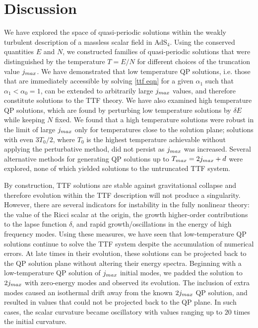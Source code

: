 \documentclass[../PhD.tex]{subfiles}
\begin{document}

\section{Discussion}
\label{sec: discussion}

We have explored the space of quasi-periodic solutions within the weakly turbulent description of a massless scalar field in AdS$_4$. Using the conserved quantities $E$ and $N$, we constructed families of quasi-periodic solutions that were distinguished by the temperature $T = E/N$ for different choices of the truncation value $j_{max}$. We have demonstrated that low temperature QP solutions, i.e. those that are immediately accessible by solving \eqref{ttf eqn} for a given $\alpha_1$ such that $\alpha_1 < \alpha_0 = 1$, can be extended to arbitrarily large $j_{max}$ values, and therefore constitute solutions to the TTF theory. We have also examined high temperature QP solutions, which are found by perturbing low temperature solutions by $\delta E$ while keeping $N$ fixed. We found that a high temperature solutions were robust in the limit of large $j_{max}$ only for temperatures close to the solution plane; solutions with even $3 T_0 / 2$, where $T_0$ is the highest temperature achievable without applying the perturbative method, did not persist as $j_{max}$ was increased. Several alternative methods for generating QP solutions up to $T_{max} = 2j_{max} + d$ were explored, none of which yielded solutions to the untruncated TTF system.

By construction, TTF solutions are stable against gravitational collapse and therefore evolution within the TTF description will not produce a singularity. However, there are several indicators for instability in the fully nonlinear theory: the value of the Ricci scalar at the origin, the growth higher-order contributions to the lapse function $\delta$, and rapid growth/oscillations in the energy of high frequency modes. Using these measures, we have seen that low-temperature QP solutions continue to solve the TTF system despite the accumulation of numerical errors. At late times in their evolution, these solutions can be projected back to the QP solution plane without altering their energy spectra. Beginning with a low-temperature QP solution of $j_{max}$ initial modes, we padded the solution to $2j_{max}$ with zero-energy modes and observed its evolution. The inclusion of extra modes caused an isothermal drift away from the known $2j_{max}$ QP solution, and resulted in values that could not be projected back to the QP plane. In such cases, the scalar curvature became oscillatory with values ranging up to $20$ times the initial curvature.
\end{document}
